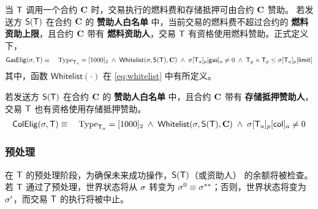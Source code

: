 当 $\textsf{T}$ 调用一个合约 $\mathbf{C}$ 时，交易执行的燃料费和存储抵押可由合约 $\mathbf{C}$ 赞助。
若发送方 $\mathsf{S}{\left({\textsf{T}} \right)}$ 在合约 $\mathbf{C}$ 的 {\bf 赞助人白名单} 中，当前交易的燃料费不超过合约的 {\bf 燃料资助上限}，且合约 $\mathbf{C}$ 带有 {\bf 燃料资助人}，交易  $\textsf{T}$  有资格使用燃料赞助。正式定义下，
\begin{align}
	\mathsf{GasElig}(\mathbf{\sigma},\textsf{T})\equiv \quad \mathrm{Type}_{\textsf{T}_a}=[1000]_2 \;\wedge\; \mathsf{Whitelist}(\mathbf{\sigma},\mathsf{S}{\left({\textsf{T}} \right)},\mathbf{C}) \;\wedge\; \mathbf{\sigma}[\textsf{T}_a]_p[\mathsf{gas}]_a\neq 0 \;\wedge\; \textsf{T}_g\times\textsf{T}_p \le \mathbf{\sigma}[\textsf{T}_a]_p[\mathsf{limit}] 
\end{align}
其中，函数 $\mathsf{Whitelist}(\cdot)$ 在 \cref{eq:whitelist} 中有所定义。

若发送方 $\mathsf{S}{\left({\textsf{T}} \right)}$ 在合约 $\mathbf{C}$ 的 {\bf 赞助人白名单} 中，且合约 $\mathbf{C}$ 带有 {\bf 存储抵押赞助人}， 交易 $\textsf{T}$ 也有资格使用存储抵押赞助。
\begin{align}
	\mathsf{ColElig}(\mathbf{\sigma},\textsf{T})\equiv \quad \mathrm{Type}_{\textsf{T}_a}=[1000]_2 \;\wedge\; \mathsf{Whitelist}(\mathbf{\sigma},\mathsf{S}{\left({\textsf{T}} \right)},\mathbf{C}) \;\wedge\; \mathbf{\sigma}[\textsf{T}_a]_p[\mathsf{col}]_a\neq 0
\end{align}

\subsubsection{预处理}
\label{subsubsec:preprocessing}

在 $\textsf{T}$ 的预处理阶段，为确保未来成功操作，$\mathsf{S}{\left({\textsf{T}} \right)}$（或资助人） 的余额将被检查。
若 $\textsf{T}$ 通过了预处理，世界状态将从 $\mathbf{\sigma}$ 转变为 $\mathbf{\sigma}^0\equiv \mathbf{\sigma}^{**}$；否则，世界状态将变为 $\mathbf{\sigma}'$，而交易 $\textsf{T}$ 的执行将被中止。

